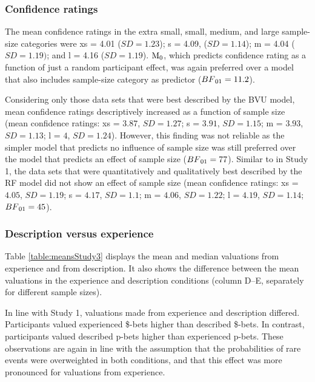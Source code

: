 \documentclass[a4paper, man, natbib, floatsintext]{apa6} %
\begin{document}
\subsubsection{Confidence ratings}
The mean confidence ratings in the extra small, small, medium, and large sample-size categories were xs = 4.01 ($SD = 1.23$); s = 4.09, ($SD = 1.14$); m = 4.04 ($SD = 1.19)$; and l = 4.16 ($SD = 1.19$). $\mathrm{M}\textsubscript{0}$, which predicts confidence rating as a function of just a random participant effect, was again preferred over a model that also includes sample-size category as predictor ($BF\textsubscript{01} = 11.2$). 

Considering only those data sets that were best described by the BVU model, mean confidence ratings descriptively increased as a function of  sample size (mean confidence ratings: xs = $3.87$, $SD = 1.27$; s = $3.91$, $SD = 1.15$; m = $3.93$, $SD = 1.13$; l = $4$, $SD = 1.24$). %
However, this finding was not reliable as the simpler model that predicts no influence of sample size was still preferred over the model that predicts an effect of sample size ($BF\textsubscript{01} = 77$). Similar to in Study 1, the data sets that were quantitatively and qualitatively best described by the RF model did not show an effect of sample size (mean confidence ratings: xs = $4.05$, $SD = 1.19$; s = $4.17$, $SD = 1.1$; m = $4.06$, $SD = 1.22$; l = $4.19$, $SD = 1.14$; $BF\textsubscript{01} = 45$).


\subsubsection{Description versus experience}

Table \ref{table:meansStudy3} displays the mean and median valuations from experience and from description. It also shows the difference between the mean valuations in the experience and description conditions (column D--E, separately for different sample sizes). 

In line with Study 1, valuations made from experience and description differed. Participants valued experienced \$-bets higher than described \$-bets. In contrast, participants valued described p-bets higher than experienced p-bets. These observations are again in line with the assumption that the probabilities of rare events were overweighted in both conditions, and that this effect was more pronounced for valuations from experience.
\end{document}
